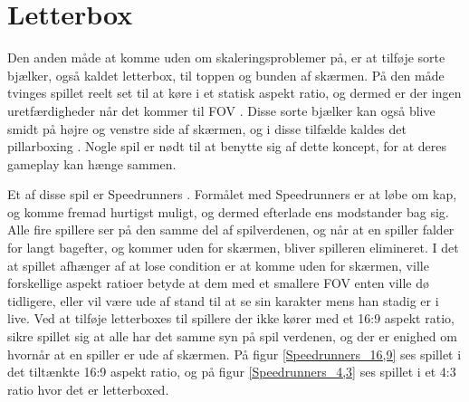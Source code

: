 \documentclass[Main.tex]{AspectRatio.tex}
\begin{document}
\section{Letterbox}

Den anden måde at komme uden om skaleringsproblemer på, er at tilføje sorte bjælker, også kaldet letterbox, til toppen og bunden af skærmen. På den måde tvinges spillet reelt set til at køre i et statisk aspekt ratio, og dermed er der ingen uretfærdigheder når det kommer til FOV \cite{computerhope}. Disse sorte bjælker kan også blive smidt på højre og venstre side af skærmen, og i disse tilfælde kaldes det pillarboxing \cite{Apple}. Nogle spil er nødt til at benytte sig af dette koncept, for at deres gameplay kan hænge sammen.

Et af disse spil er Speedrunners \cite{SpeedrunnersGame}. Formålet med Speedrunners er at løbe om kap, og komme fremad hurtigst muligt, og dermed efterlade ens modstander bag sig. Alle fire spillere ser på den samme del af spilverdenen, og når at en spiller falder for langt bagefter, og kommer uden for skærmen, bliver spilleren elimineret. I det at spillet afhænger af at lose condition er at komme uden for skærmen, ville forskellige aspekt ratioer betyde at dem med et smallere FOV enten ville dø tidligere, eller vil være ude af stand til at se sin karakter mens han stadig er i live. Ved at tilføje letterboxes til spillere der ikke kører med et 16:9 aspekt ratio, sikre spillet sig at alle har det samme syn på spil verdenen, og der er enighed om hvornår at en spiller er ude af skærmen. På figur \ref{Speedrunners_16,9} ses spillet i det tiltænkte 16:9 aspekt ratio, og på figur \ref{Speedrunners_4,3} ses spillet i et 4:3 ratio hvor det er letterboxed.
\end{document}

